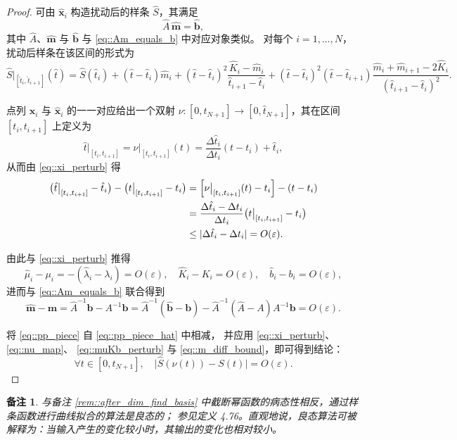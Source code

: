 \documentclass[a4paper]{ctexart}
\newtheorem{remark}{备注}
\numberwithin{theorem}{section}
\numberwithin{equation}{section}
\numberwithin{figure}{section}
\numberwithin{remark}{section}
\begin{document}
\begin{proof}
可由 $\hat{\mathbf{x}}_i$ 构造扰动后的样条 $\hat{S}$，其满足
\[
\hat{A}\,\hat{\mathbf{m}}=\hat{\mathbf{b}},
\]
其中 $\hat{A}$、$\hat{\mathbf{m}}$ 与 $\hat{\mathbf{b}}$ 与 \eqref{eq::Am_equals_b} 中对应对象类似。
对每个 $i=1,\ldots,N$，扰动后样条在该区间的形式为
\begin{equation}
    \label{eq::pp_piece_hat} 
\hat{S}\big|_{[\hat{t}_i,\hat{t}_{i+1}]}(\hat{t})
=
\hat{S}(\hat{t}_i)
+(\hat{t}-\hat{t}_i)\hat{m}_i
+(\hat{t}-\hat{t}_i)^2\frac{\hat{K}_i-\hat{m}_i}{\hat{t}_{i+1}-\hat{t}_i}
+(\hat{t}-\hat{t}_i)^2(\hat{t}-\hat{t}_{i+1})\frac{\hat{m}_i+\hat{m}_{i+1}-2\hat{K}_i}{(\hat{t}_{i+1}-\hat{t}_i)^2}.
\end{equation}

点列 $\mathbf{x}_i$ 与 $\hat{\mathbf{x}}_i$ 的一一对应给出一个双射
$\nu:[0,t_{N+1}]\to[0,\hat{t}_{N+1}]$，其在区间 $[t_i,t_{i+1}]$ 上定义为
\begin{equation}
    \label{eq::nu_map} 
\hat{t}\big|_{[t_i,t_{i+1}]}=\nu\big|_{[t_i,t_{i+1}]}(t)
=\frac{\Delta\hat{t}_i}{\Delta t_i}(t-t_i)+\hat{t}_i,
\end{equation}
从而由 \eqref{eq::xi_perturb} 得
\[
\begin{aligned}
\bigl(\hat{t}\big|_{[t_i,t_{i+1}]}- \hat{t}_i\bigr)-\bigl(t\big|_{[t_i,t_{i+1}]}- t_i\bigr)
& =\Bigl[\nu\big|_{[t_i,t_{i+1}]}(t)-t_i\Bigr]-(t-t_i) \\
& =\frac{\Delta\hat{t}_i-\Delta t_i}{\Delta t_i}\bigl(t\big|_{[t_i,t_{i+1}]}-t_i\bigr) \\
& \le \lvert\Delta\hat{t}_i-\Delta t_i\rvert=O(\varepsilon).
\end{aligned}
\]

由此与 \eqref{eq::xi_perturb} 推得
\begin{equation}
    \label{eq::muKb_perturb} 
\hat{\mu}_i-\mu_i=-(\hat{\lambda}_i-\lambda_i)=O(\varepsilon),\quad
\hat{K}_i-K_i=O(\varepsilon),\quad
\hat{b}_i-b_i=O(\varepsilon),
\end{equation}
进而与 \eqref{eq::Am_equals_b} 联合得到
\begin{equation}
    \label{eq::m_diff_bound}
\hat{\mathbf{m}}-\mathbf{m}
=\hat{A}^{-1}\hat{\mathbf{b}}-A^{-1}\mathbf{b}
=\hat{A}^{-1}(\hat{\mathbf{b}}-\mathbf{b})-\hat{A}^{-1}(\hat{A}-A)A^{-1}\mathbf{b}
=O(\varepsilon).
\end{equation}

将 \eqref{eq::pp_piece} 自 \eqref{eq::pp_piece_hat} 中相减，
并应用 \eqref{eq::xi_perturb}、\eqref{eq::nu_map}、
\eqref{eq::muKb_perturb} 与 \eqref{eq::m_diff_bound}，即可得到结论：
\[
\forall t\in[0,t_{N+1}],\quad \lvert\hat{S}(\nu(t))-S(t)\rvert=O(\varepsilon).
\]
\end{proof}

\begin{remark}
与备注 \ref{rem::after_dim_find_basis} 中截断幂函数的病态性相反，通过样条函数进行曲线拟合的算法是良态的；
参见定义 4.76。直观地说，良态算法可被解释为：当输入产生的变化较小时，其输出的变化也相对较小。
\end{remark}



\end{document}
